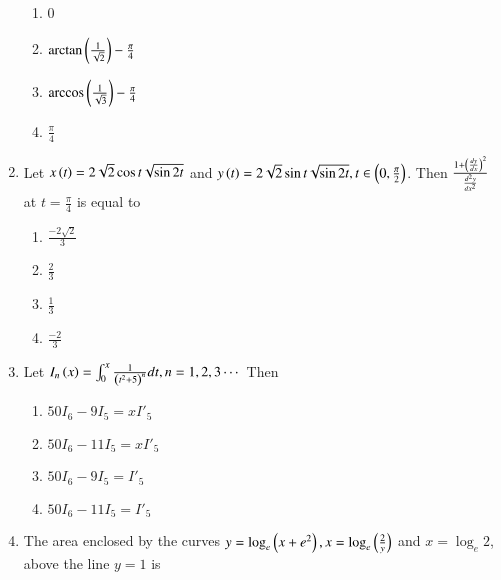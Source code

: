 \documentclass[journal]{IEEEtran}
\begin{document}
\begin{enumerate}
        \begin{multicols}{4}
            \begin{enumerate}
                \item 0
                \item $\arctan\left(\frac{1}{\sqrt{2}}\right)-\frac{\pi}{4}$
                \item $\arccos\left(\frac{1}{\sqrt{3}}\right)-\frac{\pi}{4}$
                \item $\frac{\pi}{4}$
            \end{enumerate}
        \end{multicols}
		
    \item Let $x\left(t\right)=2\sqrt{2}\cos{t}\sqrt{\sin{2t}}$ and $y\left(t\right)=2\sqrt{2}\sin{t}\sqrt{\sin{2t}},t\in\left(0,\frac{\pi}{2}\right)$. Then $\frac{1+\left(\frac{dy}{dx}\right)^2}{\frac{d^2y}{dx^2}}$ at $t=\frac{\pi}{4}$ is equal to

        \begin{multicols}{4}
            \begin{enumerate}
                \item $\frac{-2\sqrt{2}}{3}$
                \item $\frac{2}{3}$
                \item $\frac{1}{3}$
                \item $\frac{-2}{3}$
            \end{enumerate}
        \end{multicols}

    \item Let $I_n\left(x\right)=\int_0^x\frac{1}{\left(t^2+5\right)^n}dt,n=1,2,3\cdots$ Then 

        \begin{multicols}{4}
            \begin{enumerate}
                \item $50I_6-9I_5=xI'_5$
                \item $50I_6-11I_5=xI'_5$
                \item $50I_6-9I_5=I'_5$
                \item $50I_6-11I_5=I'_5$
            \end{enumerate}
        \end{multicols}

    \item The area enclosed by the curves $y=\log_e\left(x+e^2\right),x=\log_e\left(\frac{2}{y}\right)$ and $x=\log_e2$, above the line $y=1$ is


\end{enumerate}
\end{document}
